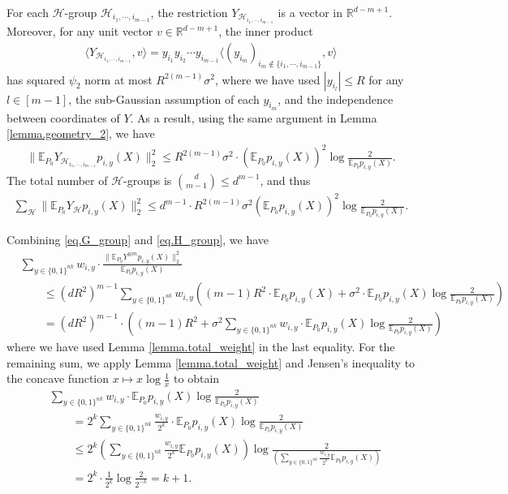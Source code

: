 \documentclass[final,12pt]{colt2018} %
\def \bE {\mathbb{E}}
\def \bR {\mathbb{R}}
\newcommand{\jiao}[1]{\langle{#1}\rangle}
\newcommand{\calH}{{\mathcal{H}}}
\begin{document}
For each $\calH$-group $\calH_{i_1,\cdots,i_{m-1}}$, the restriction $Y_{\calH_{i_1,\cdots,i_{m-1}}}$ is a vector in $\bR^{d-m+1}$. Moreover, for any unit vector $v\in \bR^{d-m+1}$, the inner product
\begin{align*}
\jiao{Y_{\calH_{i_1,\cdots,i_{m-1}}}, v} =  y_{i_1}y_{i_2}\cdots y_{i_{m-1}}\jiao{(y_{i_m})_{i_m\notin \{i_1,\cdots,i_{m-1}\} } ,v}
\end{align*} 
has squared $\psi_2$ norm at most $R^{2(m-1)}\sigma^2$, where we have used $|y_{i_l}|\le R$ for any $l\in [m-1]$, the sub-Gaussian assumption of each $y_{i_m}$, and the independence between coordinates of $Y$. As a result, using the same argument in Lemma \ref{lemma.geometry_2}, we have
\begin{align*}
\|\bE_{P_0} Y_{\calH_{i_1,\cdots,i_{m-1}}} p_{i,y}(X)\|_2^2 \le R^{2(m-1)}\sigma^2\cdot (\bE_{P_0}p_{i,y}(X) )^2\log \frac{2}{\bE_{P_0}p_{i,y}(X) }. 
\end{align*}
The total number of $\calH$-groups is $\binom{d}{m-1}\le d^{m-1}$, and thus
\begin{align}\label{eq.H_group}
\sum_{\calH} \|\bE_{P_0} Y_\calH p_{i,y}(X)\|_2^2 \le d^{m-1}\cdot R^{2(m-1)}\sigma^2(\bE_{P_0} p_{i,y}(X))^2\log \frac{2}{\bE_{P_0}p_{i,y}(X) }. 
\end{align} 

Combining \eqref{eq.G_group} and \eqref{eq.H_group}, we have
\begin{align}\label{eq.S2_m}
&\sum_{y\in\{0,1\}^{nk} }w_{i,y}\cdot \frac{ \|\bE_{P_0} Y^{\otimes m}p_{i,y}(X)\|_2^2 }{ \bE_{P_0} p_{i,y}(X) } \nonumber \\
&\qquad \le (dR^2)^{m-1}\sum_{y\in \{0,1\}^{nk}} w_{i,y}\left((m-1)R^2\cdot \bE_{P_0} p_{i,y}(X) + \sigma^2 \cdot \bE_{P_0} p_{i,y}(X)\log \frac{2}{\bE_{P_0} p_{i,y}(X)}\right) \nonumber \\
&\qquad = (dR^2)^{m-1} \cdot \left((m-1)R^2 + \sigma^2 \sum_{y\in\{0,1\}^{nk} }w_{i,y} \cdot \bE_{P_0} p_{i,y}(X)\log \frac{2}{\bE_{P_0} p_{i,y}(X)}\right) 
\end{align}
where we have used Lemma \ref{lemma.total_weight} in the last equality. For the remaining sum, we apply Lemma \ref{lemma.total_weight} and Jensen's inequality to the concave function $x\mapsto x\log \frac{1}{x}$ to obtain
\begin{align}
&\sum_{y\in\{0,1\}^{nk} }w_{i,y} \cdot \bE_{P_0} p_{i,y}(X)\log \frac{2}{\bE_{P_0} p_{i,y}(X)} \nonumber\\
&\qquad = 2^k \sum_{y\in\{0,1\}^{nk} }\frac{w_{i,y}}{2^k} \cdot \bE_{P_0} p_{i,y}(X)\log \frac{2}{\bE_{P_0} p_{i,y}(X)} \nonumber\\
&\qquad \le 2^k \left(\sum_{y\in\{0,1\}^{nk} }\frac{w_{i,y}}{2^k}\bE_{P_0} p_{i,y}(X)\right)\log \frac{2}{\left(\sum_{y\in\{0,1\}^{nk} }\frac{w_{i,y}}{2^k}\bE_{P_0} p_{i,y}(X)\right)} \nonumber\\
&\qquad = 2^k \cdot \frac{1}{2^k}\log \frac{2}{2^{-k}} =k +1 \label{eq.jensen}.
\end{align}
\end{document}
